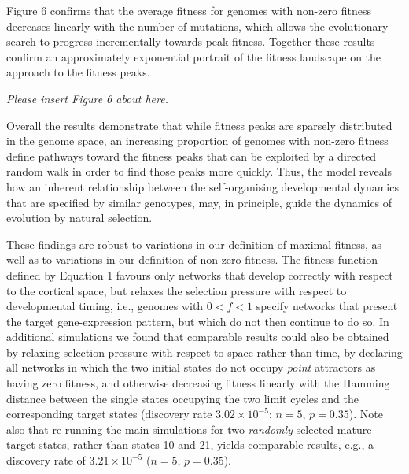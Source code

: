\documentclass[10pt,letterpaper]{article}
\begin{document}

Figure 6 confirms that the average fitness for genomes with non-zero fitness decreases linearly with the number of mutations, which allows the evolutionary search to progress incrementally towards peak fitness. Together these results confirm an approximately exponential portrait of the fitness landscape on the approach to the fitness peaks. 

\vspace{1em}\emph{\noindent Please insert Figure 6 about here.}\vspace{1em}

Overall the results demonstrate that while fitness peaks are sparsely distributed in the genome space, an increasing proportion of genomes with non-zero fitness define pathways toward the fitness peaks that can be exploited by a directed random walk in order to find those peaks more quickly. Thus, the model reveals how an inherent relationship between the self-organising developmental dynamics that are specified by similar genotypes, may, in principle, guide the dynamics of evolution by natural selection. 

These findings are robust to variations in our definition of maximal fitness, as well as to variations in our definition of non-zero fitness. The fitness function defined by Equation 1 favours only networks that develop correctly with respect to the cortical space, but relaxes the selection pressure with respect to developmental timing, i.e., genomes with $0<f<1$ specify networks that present the target gene-expression pattern, but which do not then continue to do so. In additional simulations we found that comparable results could also be obtained by relaxing selection pressure with respect to space rather than time, by declaring all networks in which the two initial states do not occupy \emph{point} attractors as having zero fitness, and otherwise decreasing fitness linearly with the Hamming distance between the single states occupying the two limit cycles and the corresponding target states (discovery rate $3.02\times 10^{-5}$; $n=5$, $p=0.35$). Note also that re-running the main simulations for two \emph{randomly} selected mature target states, rather than states 10 and 21, yields comparable results, e.g., a discovery rate of $3.21\times 10^{-5}$ ($n=5$, $p=0.35$).%
\end{document}
